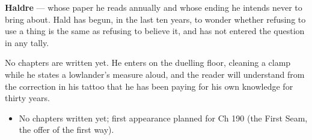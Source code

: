 \documentclass{design/chronicle}
\begin{document}
{\textbf{Haldre} — whose paper he reads annually and whose ending he intends never to bring about. Hald has begun, in the last ten years, to wonder whether refusing to use a thing is the same as refusing to believe it, and has not entered the question in any tally.

No chapters are written yet. He enters on the duelling floor, cleaning a clamp while he states a lowlander’s measure aloud, and the reader will understand from the correction in his tattoo that he has been paying for his own knowledge for thirty years.

\begin{itemize}[leftmargin=1.4em,itemsep=1pt,topsep=3pt,parsep=0pt]

\item No chapters written yet; first appearance planned for Ch 190 (the First Seam, the offer of the first way).

\end{itemize}
}
\end{document}

